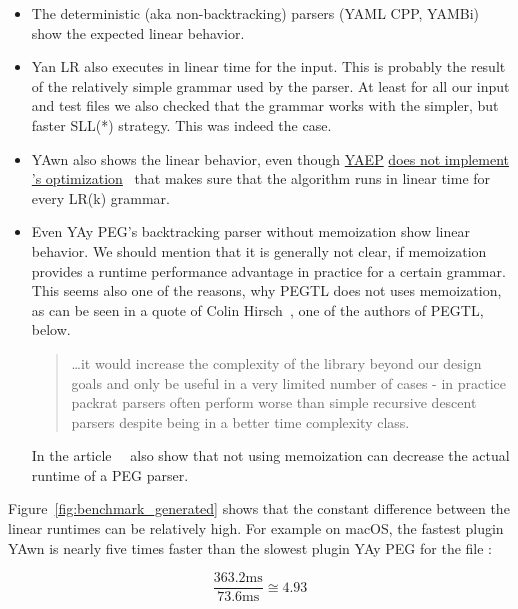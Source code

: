 \begin{itemize}
  \item The deterministic (aka non-backtracking) parsers (YAML CPP, YAMBi) show the expected linear behavior.

  \item Yan LR also executes in linear time for the input. This is probably the result of the relatively simple grammar used by the parser. At least for all our input and test files we also checked that the grammar works with the simpler, but faster \gls{SLL(*)} strategy. This was indeed the case.

  \item YAwn also shows the linear behavior, even though \href{https://github.com/vnmakarov/yaep}{\gls{YAEP}} \href{https://github.com/vnmakarov/yaep/issues/24}{does not implement \citeauthor{leo1991general}’s optimization}~\cite{leo1991general} that makes sure that the algorithm runs in linear time for every LR(k) grammar.

  \item Even YAy PEG’s backtracking parser without memoization show linear behavior. We should mention that it is generally not clear, if memoization provides a runtime performance advantage in practice for a certain grammar. This seems also one of the reasons, why \gls{PEGTL} does not uses memoization, as can be seen in a quote of Colin Hirsch~\cite{hirsch2016memo}, one of the authors of \gls{PEGTL}, below.

  \begin{quote}
     …it would increase the complexity of the library beyond our design goals and only be useful in a very limited number of cases - in practice packrat parsers often perform worse than simple recursive descent parsers despite being in a better time complexity class.
  \end{quote}

  In the article~~\cite{hudak2008dcgs} \citeauthor{hudak2008dcgs} also show that not using memoization can decrease the actual runtime of a PEG parser.

\end{itemize}

Figure~\ref{fig:benchmark_generated} shows that the constant difference between the linear runtimes can be relatively high. For example on macOS, the fastest plugin YAwn is nearly five times faster than the slowest plugin YAy PEG for the file \FileGenerated{}:

\begin{equation}
  \frac{363.2\text{ms}}{73.6\text{ms}} ≅ 4.93
  \label{eq:benchmark_difference}
\end{equation}

